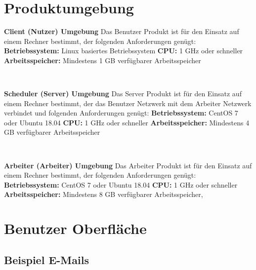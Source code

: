 \documentclass[a4paper,12pt]{article}
\begin{document}
\section{Produktumgebung}

\begin{itemize}
\begin{minipage}[t]{\linewidth}
\item \textbf{Client (Nutzer) Umgebung}\newline
Das \gls{Benutzer} Produkt ist für den Einsatz auf einem Rechner bestimmt, der folgenden Anforderungen genügt:
\subitem \textbf{Betriebssystem:} Linux basiertes Betriebssystem
\subitem \textbf{CPU:} 1 GHz oder schneller
\subitem \textbf{Arbeitsspeicher:} Mindestens 1 GB verfügbarer Arbeitsspeicher
\end{minipage}
\\

\begin{minipage}[t]{\linewidth}
\item \textbf{Scheduler (\gls{Server}) Umgebung}\newline
Das \gls{Server} Produkt ist für den Einsatz auf einem Rechner bestimmt, der das \gls{Benutzer} Netzwerk mit dem Arbeiter Netzwerk verbindet und folgenden Anforderungen genügt:
\subitem \textbf{Betriebssystem:} CentOS 7 oder Ubuntu 18.04
\subitem \textbf{CPU:} 1 GHz oder schneller
\subitem \textbf{Arbeitsspeicher:} Mindestens 4 GB verfügbarer Arbeitsspeicher
\end{minipage}
\\

\begin{minipage}[t]{\linewidth}
\item \textbf{Arbeiter (\gls{Arbeiter}) Umgebung}\newline
Das Arbeiter Produkt ist für den Einsatz auf einem Rechner bestimmt, der folgenden Anforderungen genügt:
\subitem \textbf{Betriebssystem:} CentOS 7 oder Ubuntu 18.04
\subitem \textbf{CPU:} 1 GHz oder schneller
\subitem \textbf{Arbeitsspeicher:} Mindestens 8 GB verfügbarer Arbeitsspeicher, 
\end{minipage}
\end{itemize}

\clearpage
\section{Benutzer Oberfläche}

\subsection {Beispiel E-Mails}
\end{document}
